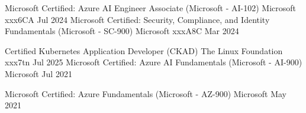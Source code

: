 

\begin{cvhonors}

  \cvhonor
    {Microsoft Certified: Azure AI Engineer Associate (Microsoft - AI-102)} %
    {Microsoft} %
    {xxx6CA} %
    {Jul 2024} %
  \cvhonor
    {Microsoft Certified: Security, Compliance, and Identity Fundamentals (Microsoft - SC-900)} %
    {Microsoft} %
    {xxxA8C} %
    {Mar 2024} %

  \cvhonor
    {Certified Kubernetes Application Developer (CKAD)} %
    {The Linux Foundation} %
    {xxx7tn} %
    {Jul 2025} %
  \cvhonor
    {Microsoft Certified: Azure AI Fundamentals (Microsoft - AI-900)} %
    {Microsoft} %
    {} %
    {Jul 2021} %

  \cvhonor
    {Microsoft Certified: Azure Fundamentals (Microsoft - AZ-900)} %
    {Microsoft} %
    {} %
    {May 2021} %

\end{cvhonors}
